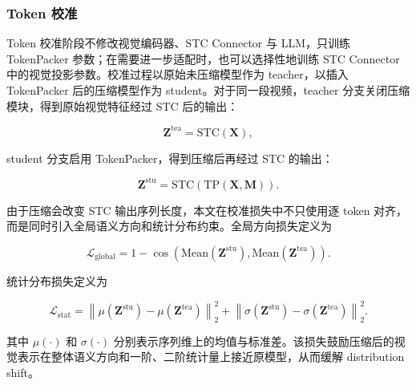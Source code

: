 \subsubsection{Token 校准}

\par Token 校准阶段不修改视觉编码器、STC Connector 与 LLM，只训练 TokenPacker 参数；在需要进一步适配时，也可以选择性地训练 STC Connector 中的视觉投影参数。校准过程以原始未压缩模型作为 teacher，以插入 TokenPacker 后的压缩模型作为 student。对于同一段视频，teacher 分支关闭压缩模块，得到原始视觉特征经过 STC 后的输出：

\begin{equation}
    \label{equ:method-teacher-feature}
    \mathbf{Z}^{\mathrm{tea}}
    =
    \mathrm{STC}(\mathbf{X}),
\end{equation}

\par student 分支启用 TokenPacker，得到压缩后再经过 STC 的输出：

\begin{equation}
    \label{equ:method-student-feature}
    \mathbf{Z}^{\mathrm{stu}}
    =
    \mathrm{STC}(\mathrm{TP}(\mathbf{X},\mathbf{M})).
\end{equation}

\par 由于压缩会改变 STC 输出序列长度，本文在校准损失中不只使用逐 token 对齐，而是同时引入全局语义方向和统计分布约束。全局方向损失定义为

\begin{equation}
    \label{equ:method-global-loss}
    \mathcal{L}_{\mathrm{global}}
    =
    1 -
    \cos
    \left(
        \mathrm{Mean}(\mathbf{Z}^{\mathrm{stu}}),
        \mathrm{Mean}(\mathbf{Z}^{\mathrm{tea}})
    \right).
\end{equation}

\par 统计分布损失定义为

\begin{equation}
    \label{equ:method-stat-loss}
    \mathcal{L}_{\mathrm{stat}}
    =
    \left\|
        \mu(\mathbf{Z}^{\mathrm{stu}}) -
        \mu(\mathbf{Z}^{\mathrm{tea}})
    \right\|_2^2
    +
    \left\|
        \sigma(\mathbf{Z}^{\mathrm{stu}}) -
        \sigma(\mathbf{Z}^{\mathrm{tea}})
    \right\|_2^2.
\end{equation}

\par 其中 $\mu(\cdot)$ 和 $\sigma(\cdot)$ 分别表示序列维上的均值与标准差。该损失鼓励压缩后的视觉表示在整体语义方向和一阶、二阶统计量上接近原模型，从而缓解 distribution shift。


